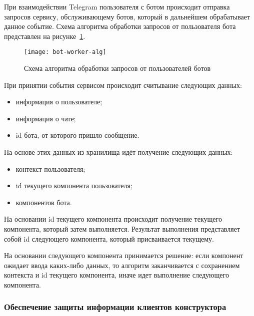 При взаимодействии Telegram пользователя с ботом происходит
отправка запросов сервису, обслуживающему ботов, который в дальнейшем
обрабатывает данное событие. Схема алгоритма обработки запросов от
пользователя бота представлен на рисунке~\ref{f:bot-worker-alg}.


\begin{figure}[hp]
	\centering
	\texttt{[image: bot-worker-alg]}
	\caption{Схема алгоритма обработки запросов от пользователей ботов}
	\label{f:bot-worker-alg}
\end{figure}

При принятии события сервисом происходит считывание следующих
данных:
\begin{itemize}
	\item информация о пользователе;
	\item информация о чате;
	\item id бота, от которого пришло сообщение.
\end{itemize}

На основе этих данных из хранилища идёт получение следующих
данных:
\begin{itemize}
	\item контекст пользователя;
	\item id текущего компонента пользователя;
	\item компонентов бота.
\end{itemize}

На основании id текущего компонента происходит получение текущего
компонента, который затем выполняется. Результат выполнения представляет
собой id следующего компонента, который присваивается текущему.

На основании следующего компонента принимается решение: если
компонент ожидает ввода каких-либо данных, то алгоритм заканчивается с
сохранением контекста и id текущего компонента, иначе идет выполнение
следующего компонента.

\newpage

\subsubsection{Обеспечение защиты информации клиентов конструктора}
